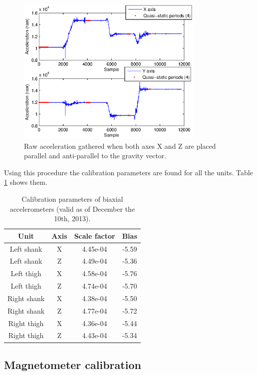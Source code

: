 \begin{figure}[t]
\centering
\includegraphics[width=0.8\textwidth]{figures/acc_raw_4_positions.eps}
\caption{Raw acceleration gathered when both axes X and Z are placed parallel and anti-parallel to the gravity vector.}
\label{fig:acc_raw_4_positions}
\end{figure}

Using this procedure the calibration parameters are found for all the units. Table \ref{tab:acc2D_cal_params} shows them. 

\begin{table}[H]\footnotesize
\caption{Calibration parameters of biaxial accelerometers (valid as of December the 10th, 2013).}
	\centering
		\begin{tabular}{|c|c|c|c|}\hline
		\label{tab:acc2D_cal_params}
		Unit				& Axis 	& Scale factor 	& Bias 	\\ \hline
		Left shank 	& X			& 4.45e-04			& -5.59 \\
		Left shank 	& Z			& 4.49e-04			& -5.36 \\
		Left thigh	& X			& 4.58e-04			& -5.76 \\
		Left thigh	& Z			& 4.74e-04			& -5.70 \\
		Right shank & X			& 4.38e-04			& -5.50 \\
		Right shank & Z			& 4.77e-04			& -5.72 \\
		Right thigh & X			& 4.36e-04			& -5.44 \\
		Right thigh & Z			& 4.43e-04			& -5.34 \\ \hline
		\end{tabular}
\end{table}

\subsection{Magnetometer calibration}
\label{subsec:mag_calibration}

